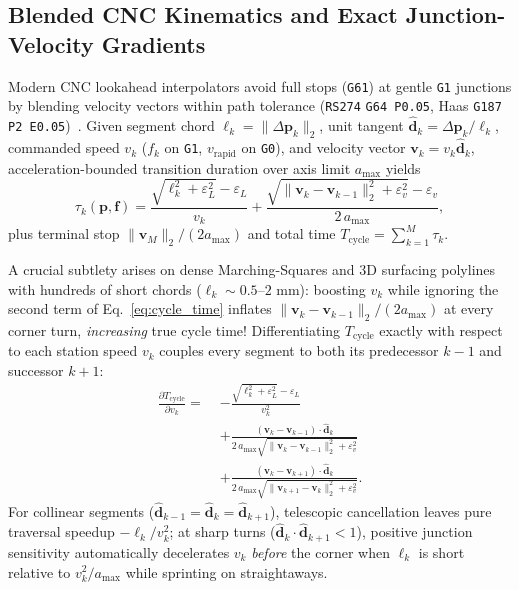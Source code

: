 \documentclass[conference]{IEEEtran}
\begin{document}
\subsection{Blended CNC Kinematics and Exact Junction-Velocity Gradients}
\label{sec:blended_kinematics}
Modern CNC lookahead interpolators avoid full stops (\texttt{G61}) at gentle \texttt{G1} junctions by blending velocity vectors within path tolerance (\texttt{RS274} \texttt{G64 P0.05}, Haas \texttt{G187 P2 E0.05})~\cite{erkorkmaz2001highspeed,kramer2000rs274ngc}. Given segment chord $\ell_k = \|\Delta\mathbf{p}_k\|_2$, unit tangent $\hat{\mathbf{d}}_k = \Delta\mathbf{p}_k / \ell_k$, commanded speed $v_k$ ($f_k$ on \texttt{G1}, $v_{\text{rapid}}$ on \texttt{G0}), and velocity vector $\mathbf{v}_k = v_k \hat{\mathbf{d}}_k$, acceleration-bounded transition duration over axis limit $a_{\max}$ yields
\begin{equation}
  \tau_k(\mathbf{p}, \mathbf{f}) = \frac{\sqrt{\ell_k^2 + \varepsilon_L^2} - \varepsilon_L}{v_k} + \frac{\sqrt{\|\mathbf{v}_k - \mathbf{v}_{k-1}\|_2^2 + \varepsilon_v^2} - \varepsilon_v}{2\,a_{\max}},
  \label{eq:cycle_time}
\end{equation}
plus terminal stop $\|\mathbf{v}_M\|_2 / (2 a_{\max})$ and total time $T_{\text{cycle}} = \sum_{k=1}^M \tau_k$.

A crucial subtlety arises on dense Marching-Squares and 3D surfacing polylines with hundreds of short chords ($\ell_k \sim 0.5\text{--}2\text{ mm}$): boosting $v_k$ while ignoring the second term of Eq.~\eqref{eq:cycle_time} inflates $\|\mathbf{v}_k - \mathbf{v}_{k-1}\|_2 / (2 a_{\max})$ at every corner turn, \emph{increasing} true cycle time! Differentiating $T_{\text{cycle}}$ exactly with respect to each station speed $v_k$ couples every segment to both its predecessor $k-1$ and successor $k+1$:
\begin{equation}
  \begin{aligned}
    \frac{\partial T_{\text{cycle}}}{\partial v_k} =\;& -\frac{\sqrt{\ell_k^2 + \varepsilon_L^2} - \varepsilon_L}{v_k^2} \\
    &+ \frac{(\mathbf{v}_k - \mathbf{v}_{k-1})\cdot \hat{\mathbf{d}}_k}{2\,a_{\max}\sqrt{\|\mathbf{v}_k - \mathbf{v}_{k-1}\|_2^2 + \varepsilon_v^2}} \\
    &+ \frac{(\mathbf{v}_k - \mathbf{v}_{k+1})\cdot \hat{\mathbf{d}}_k}{2\,a_{\max}\sqrt{\|\mathbf{v}_{k+1} - \mathbf{v}_k\|_2^2 + \varepsilon_v^2}}.
  \end{aligned}
  \label{eq:junction_grad}
\end{equation}
For collinear segments ($\hat{\mathbf{d}}_{k-1} = \hat{\mathbf{d}}_k = \hat{\mathbf{d}}_{k+1}$), telescopic cancellation leaves pure traversal speedup $-\ell_k/v_k^2$; at sharp turns ($\hat{\mathbf{d}}_k \cdot \hat{\mathbf{d}}_{k+1} < 1$), positive junction sensitivity automatically decelerates $v_k$ \emph{before} the corner when $\ell_k$ is short relative to $v_k^2 / a_{\max}$ while sprinting on straightaways.
\end{document}
